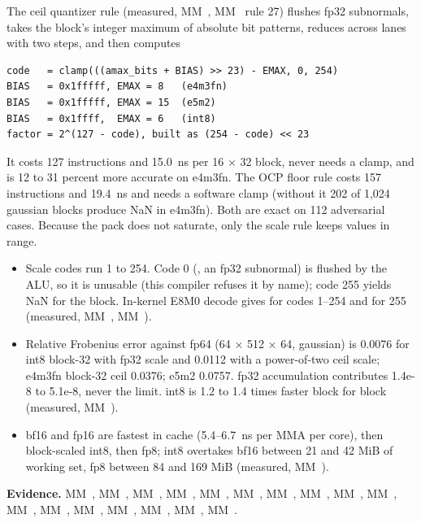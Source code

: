 The ceil quantizer rule (measured, MM~, MM~ rule 27) flushes fp32 subnormals, takes the block's integer maximum
of absolute bit patterns, reduces across lanes with two  steps, and then computes

\begin{lstlisting}
code   = clamp(((amax_bits + BIAS) >> 23) - EMAX, 0, 254)
BIAS   = 0x1fffff, EMAX = 8   (e4m3fn)
BIAS   = 0x1fffff, EMAX = 15  (e5m2)
BIAS   = 0x1ffff,  EMAX = 6   (int8)
factor = 2^(127 - code), built as (254 - code) << 23
\end{lstlisting}

It costs 127 instructions and 15.0~ns per 16 × 32 block, never needs a clamp, and is 12 to 31 percent more accurate on
e4m3fn. The OCP floor rule costs 157 instructions and 19.4~ns and needs a software clamp (without it 202 of 1,024
gaussian blocks produce NaN in e4m3fn). Both are exact on 112 adversarial cases. Because the pack does not saturate,
only the scale rule keeps values in range.

\begin{itemize}
\item Scale codes run 1 to 254. Code 0 (, an fp32 subnormal) is flushed by the ALU, so it is unusable (this
  compiler refuses it by name); code 255 yields NaN for the block. In-kernel E8M0 decode
   gives  for codes 1–254 and  for 255 (measured, MM~,
  MM~).
\item Relative Frobenius error against fp64 (64 × 512 × 64, gaussian) is 0.0076 for int8 block-32 with fp32 scale and
  0.0112 with a power-of-two ceil scale; e4m3fn block-32 ceil 0.0376; e5m2 0.0757. fp32 accumulation contributes 1.4e-8 to
  5.1e-8, never the limit. int8 is 1.2 to 1.4 times faster block for block (measured, MM~).
\item bf16 and fp16 are fastest in cache (5.4–6.7~ns per MMA per core), then block-scaled
  int8, then fp8; int8 overtakes bf16 between 21 and 42 MiB of working set, fp8 between 84 and 169 MiB (measured,
  MM~).
\end{itemize}

\textbf{Evidence.} MM~, MM~, MM~, MM~, MM~, MM~, MM~, MM~, MM~, MM~, MM~, MM~, MM~,
MM~, MM~, MM~, MM~.


